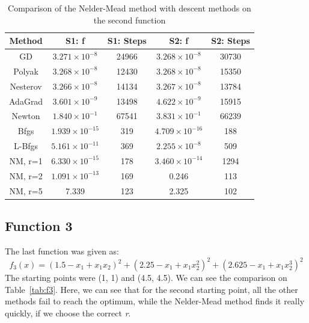 \documentclass[9pt]{IEEEtran}
\begin{document}
\begin{table}[h]
    \centering
    \begin{tabular}{|c|c|c|c|c|}
        \hline
        \textbf{Method} & \textbf{S1: f} & \textbf{S1: Steps} & \textbf{S2: f} & \textbf{S2: Steps} \\ \hline
        GD       & $3.271 \times 10^{-8}$ & 24966  & $3.268 \times 10^{-8}$  & 30730 \\ \hline
        Polyak   & $3.268 \times 10^{-8}$ & 12430 & $3.268 \times 10^{-8}$   & 15350 \\ \hline
        Nesterov & $3.266 \times 10^{-8}$& 14134   & $3.267 \times 10^{-8}$  & 13784 \\ \hline
        AdaGrad  & $3.601 \times 10^{-9}$  & 13498   & $4.622 \times 10^{-9}$& 15915 \\ \hline
        Newton   & $1.840 \times 10^{-1}$ & 67541  & $3.831 \times 10^{-1}$  & 66239 \\ \hline
        Bfgs     & $1.939 \times 10^{-15}$& 319 & $4.709 \times 10^{-16}$     & 188   \\ \hline
        L-Bfgs   & $5.161 \times 10^{-11}$  & 369& $2.255 \times 10^{-8}$    & 509   \\ \hline
        NM, r=1 & $6.330 \times 10^{-15}$  & 178 & $3.460 \times 10^{-14}$ & 1294  \\ \hline
        NM, r=2 & $1.091 \times 10^{-13}$  & 169 & 0.246 & 113 \\ \hline
        NM, r=5 & 7.339 & 123 & 2.325 & 102  \\ \hline
    
    \end{tabular}
    \caption{Comparison of the Nelder-Mead method with descent methods on the second 
    function}
    \label{tab:f2}
\end{table}


\subsection*{Function 3}
The last function was given as: 
\[
f_3(x) = (1.5 - x_1 + x_1 x_2)^2 + (2.25 - x_1 + x_1 x_2^2)^2 + (2.625 - x_1 + x_1 x_2^3)^2
\]
The starting points were (1, 1) and (4.5, 4.5). We can see the comparison on 
Table~\ref{tab:f3}. Here, we can see that for the second starting point, all the 
other methods fail to reach the optimum, while the Nelder-Mead method finds it 
really quickly, if we choose the correct \textit{r}. 
\end{document}

